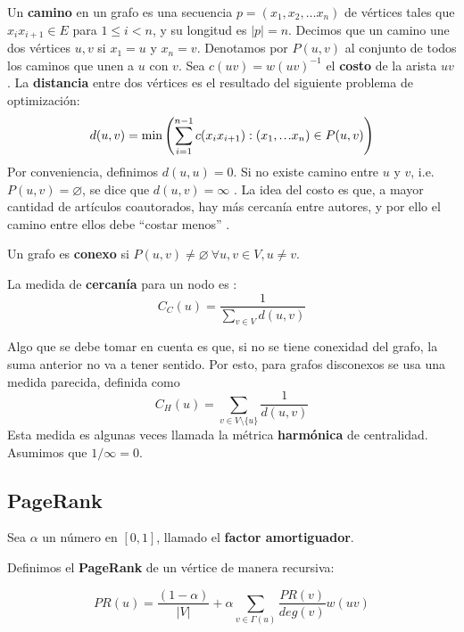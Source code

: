 \documentclass[journal]{IEEEtran}
\newcommand\mydots{\hbox to 1em{.\hss.\hss.}}
\begin{document}
Un \textbf{camino} en un grafo es una secuencia \(p = (x_1, x_2, \dots x_n)\) de vértices tales que \(x_{i}x_{i+1} \in E\) para \(1 \leq i < n\), y su longitud es \(|p| = n\). Decimos que un camino une dos vértices \(u, v\) si \(x_1 = u\) y \(x_n = v\). Denotamos por \(P(u, v)\) al conjunto de todos los caminos que unen a \(u\) con \(v\). Sea \(c(uv) = w(uv)^{-1}\) el \textbf{costo} de la arista \(uv\). La \textbf{distancia} entre dos vértices es el resultado del siguiente problema de optimización:
\begin{equation} \label{eq:distance}
d(u, v) = \min \left(\sum_{i=1}^{n-1} c(x_{i}x_{i+1}) : (x_1, \mydots x_n) \in P(u, v)\right)
\end{equation}
Por conveniencia, definimos \(d(u, u) = 0\). Si no existe camino entre \(u\) y \(v\), i.e. \(P(u, v) = \varnothing\), se dice que \(d(u, v) = \infty\) \cite{bollobas}. La idea del costo es que, a mayor cantidad de artículos coautorados, hay más cercanía entre autores, y por ello el camino entre ellos debe ``costar menos'' \cite{newman}.

Un grafo es \textbf{conexo} si \(P(u, v) \neq \varnothing~\forall u, v \in V, u \neq v\).

La medida de \textbf{cercanía} para un nodo es \cite{brandes}:
\begin{equation} \label{eq:close}
C_C (u) = \frac{1}{\sum_{v \in V} d(u, v)}
\end{equation}

Algo que se debe tomar en cuenta es que, si no se tiene conexidad del grafo, la suma anterior no va a tener sentido. Por esto, para grafos disconexos se usa una medida parecida, definida como
\begin{equation}
C_H (u) = \sum_{v \in V \setminus \{u\}} \frac{1}{d(u, v)}
\end{equation}
Esta medida es algunas veces llamada la métrica \textbf{harmónica} de centralidad\cite{rochat}. Asumimos que \(1/\infty = 0\).

\subsection{PageRank}

Sea \(\alpha\) un número en \([0, 1]\), llamado el \textbf{factor amortiguador}.

Definimos el \textbf{PageRank} de un vértice de manera recursiva:

\begin{equation} \label{eq:pagerank}
	PR(u) = \frac{(1-\alpha)}{|V|} + \alpha \sum_{v \in \Gamma(u)} \frac{PR(v)}{deg(v)} w(uv)
\end{equation}
\end{document}
